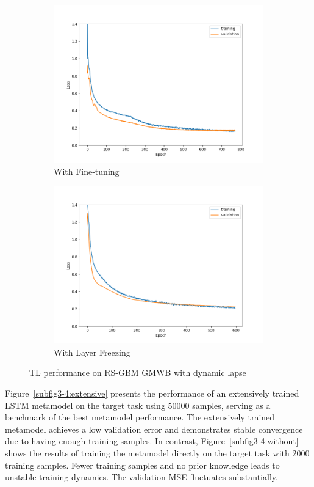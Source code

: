 \begin{figure}[ht!]
\begin{subfigure}{0.48\textwidth}
        \includegraphics[width=\textwidth]{./project3/figures/figure4c.png}
        \caption{With Fine-tuning}
        \label{subfig3-4:fineTuning}
    \end{subfigure}\hfill
    \begin{subfigure}{0.48\textwidth}
        \includegraphics[width=\textwidth]{./project3/figures/figure4d.png}
        \caption{With Layer Freezing}
        \label{subfig3-4:layerFreezing}
    \end{subfigure}
    \caption{TL performance on RS-GBM GMWB with dynamic lapse}
    \label{fig3:figure4}
\end{figure}

Figure~\ref{subfig3-4:extensive} presents the performance of an extensively trained LSTM metamodel on the target task using $\num{50000}$ samples, serving as a benchmark of the best metamodel performance. 
The extensively trained metamodel achieves a low validation error and demonstrates stable convergence due to having enough training samples. 
In contrast, Figure~\ref{subfig3-4:without} shows the results of training the metamodel directly on the target task with $\num{2000}$ training samples. 
Fewer training samples and no prior knowledge leads to unstable training dynamics. 
The validation MSE fluctuates substantially.

